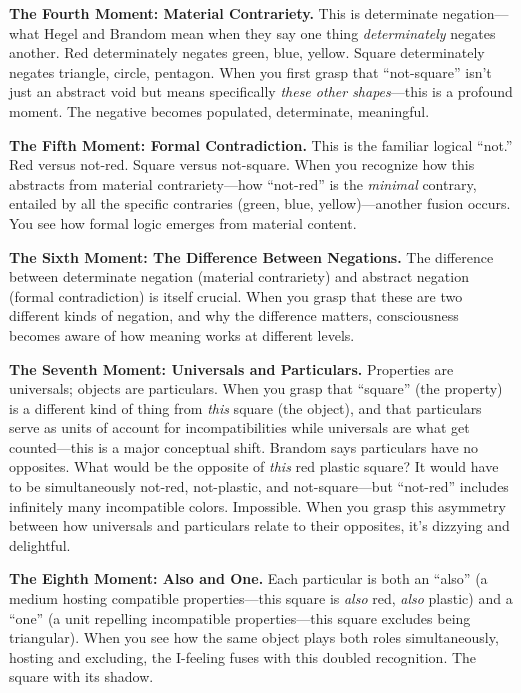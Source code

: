 \documentclass[12pt]{book}
\begin{document}
\textbf{The Fourth Moment: Material Contrariety.} This is determinate negation---what Hegel and Brandom mean when they say one thing \emph{determinately} negates another. Red determinately negates green, blue, yellow. Square determinately negates triangle, circle, pentagon. When you first grasp that ``not-square'' isn't just an abstract void but means specifically \emph{these other shapes}---this is a profound moment. The negative becomes populated, determinate, meaningful.

\textbf{The Fifth Moment: Formal Contradiction.} This is the familiar logical ``not.'' Red versus not-red. Square versus not-square. When you recognize how this abstracts from material contrariety---how ``not-red'' is the \emph{minimal} contrary, entailed by all the specific contraries (green, blue, yellow)---another fusion occurs. You see how formal logic emerges from material content.

\textbf{The Sixth Moment: The Difference Between Negations.} The difference between determinate negation (material contrariety) and abstract negation (formal contradiction) is itself crucial. When you grasp that these are two different kinds of negation, and why the difference matters, consciousness becomes aware of how meaning works at different levels.

\textbf{The Seventh Moment: Universals and Particulars.} Properties are universals; objects are particulars. When you grasp that ``square'' (the property) is a different kind of thing from \emph{this} square (the object), and that particulars serve as units of account for incompatibilities while universals are what get counted---this is a major conceptual shift. Brandom says particulars have no opposites. What would be the opposite of \emph{this} red plastic square? It would have to be simultaneously not-red, not-plastic, and not-square---but ``not-red'' includes infinitely many incompatible colors. Impossible. When you grasp this asymmetry between how universals and particulars relate to their opposites, it's dizzying and delightful.

\textbf{The Eighth Moment: Also and One.} Each particular is both an ``also'' (a medium hosting compatible properties---this square is \emph{also} red, \emph{also} plastic) and a ``one'' (a unit repelling incompatible properties---this square excludes being triangular). When you see how the same object plays both roles simultaneously, hosting and excluding, the I-feeling fuses with this doubled recognition. The square with its shadow.
\end{document}
